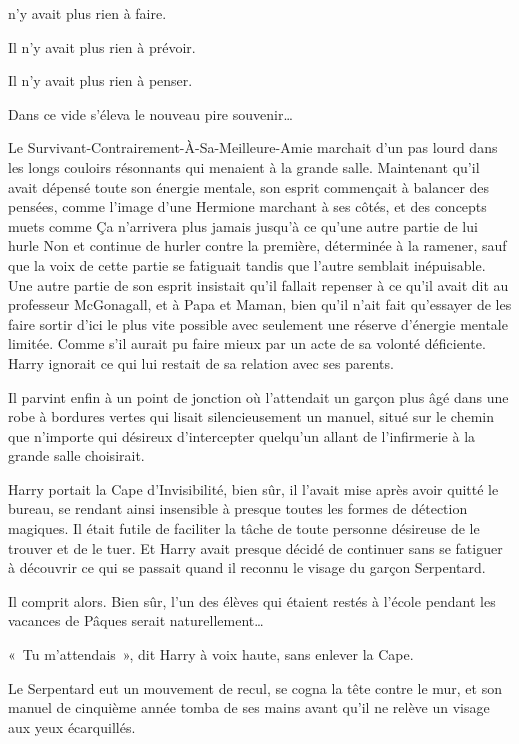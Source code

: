 
 n'y avait plus rien à faire.

\hplettrineextrapara
Il n'y avait plus rien à prévoir.

Il n'y avait plus rien à penser.

Dans ce vide s'éleva le nouveau pire souvenir…

Le Survivant-Contrairement-À-Sa-Meilleure-Amie marchait d'un pas lourd dans les longs couloirs résonnants qui menaient à la grande salle. Maintenant qu'il avait dépensé toute son énergie mentale, son esprit commençait à balancer des pensées, comme l'image d'une Hermione marchant à ses côtés, et des concepts muets comme Ça n'arrivera plus jamais jusqu'à ce qu'une autre partie de lui hurle Non et continue de hurler contre la première, déterminée à la ramener, sauf que la voix de cette partie se fatiguait tandis que l'autre semblait inépuisable. Une autre partie de son esprit insistait qu'il fallait repenser à ce qu'il avait dit au professeur McGonagall, et à Papa et Maman, bien qu'il n'ait fait qu'essayer de les faire sortir d'ici le plus vite possible avec seulement une réserve d'énergie mentale limitée. Comme s'il aurait pu faire mieux par un acte de sa volonté déficiente. Harry ignorait ce qui lui restait de sa relation avec ses parents.

Il parvint enfin à un point de jonction où l'attendait un garçon plus âgé dans une robe à bordures vertes qui lisait silencieusement un manuel, situé sur le chemin que n'importe qui désireux d'intercepter quelqu'un allant de l'infirmerie à la grande salle choisirait.

Harry portait la Cape d'Invisibilité, bien sûr, il l'avait mise après avoir quitté le bureau, se rendant ainsi insensible à presque toutes les formes de détection magiques. Il était futile de faciliter la tâche de toute personne désireuse de le trouver et de le tuer. Et Harry avait presque décidé de continuer sans se fatiguer à découvrir ce qui se passait quand il reconnu le visage du garçon Serpentard.

Il comprit alors. Bien sûr, l'un des élèves qui étaient restés à l'école pendant les vacances de Pâques serait naturellement…

«~Tu m'attendais~», dit Harry à voix haute, sans enlever la Cape.

Le Serpentard eut un mouvement de recul, se cogna la tête contre le mur, et son manuel de cinquième année tomba de ses mains avant qu'il ne relève un visage aux yeux écarquillés.

